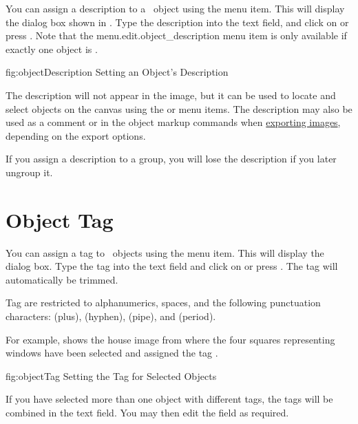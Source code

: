 You can assign a description to a \selected\ \gls*{object} using the
 menu item. This will display the
dialog box shown in . Type the
description into the text field, and click on  or press
.  Note that the \gls{menu.edit.object_description}
menu item is only available if exactly one object is \selected.

\FloatFig
  {fig:objectDescription}
  {}
  {Setting an Object's Description}

The description will not appear in the image, but it can be used to
locate and select \glspl*{object} on the canvas using the
 or
 menu items. The description
may also be used as a comment or in the object markup commands when
\hyperref[sec:exportimage]{exporting images}, depending on the
export options.

\begin{important}
If you assign a description to a \gls{group},
you will lose the description if you later ungroup it.
\end{important}

\section{Object Tag}\label{sec:objecttag}


You can assign a tag to \selected\ \glspl*{object} using the
 menu item.  This will display the
 dialog box. Type the tag into the text field and click
on  or press . The tag will
automatically be trimmed.

\begin{important}
Tag are restricted to alphanumerics, spaces, and the following
punctuation characters: \code{+} (plus), \code{-} (hyphen), 
\code{|} (pipe), and  (period).
\end{important}

For example,  shows the house
image from  where the four squares
representing windows have been selected and assigned the tag
.

\FloatFig
 {fig:objectTag}
 {}
 {Setting the Tag for Selected Objects}

\begin{information}
If you have selected more than one \gls{object} with different tags,
the tags will be combined in the text field. You may then edit the
field as required.
\end{information}


